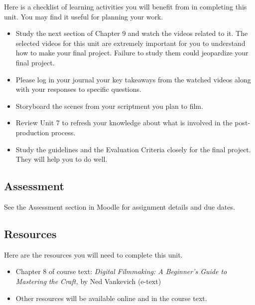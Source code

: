 \documentclass[
]{book}
\providecommand{\tightlist}{%
  \setlength{\itemsep}{0pt}\setlength{\parskip}{0pt}}
\begin{document}
\begin{reflect}
Here is a checklist of learning activities you will benefit from in completing this unit. You may find it useful for planning your work.

\begin{itemize}
\tightlist
\item
  Study the next section of Chapter 9 and watch the videos related to it. The selected videos for this unit are extremely important for you to understand how to make your final project. Failure to study them could jeopardize your final project.
\item
  Please log in your journal your key takeaways from the watched videos along with your responses to specific questions.
\item
  Storyboard the scenes from your scriptment you plan to film.
\item
  Review Unit 7 to refresh your knowledge about what is involved in the post-production process.
\item
  Study the guidelines and the Evaluation Criteria closely for the final project. They will help you to do well.
\end{itemize}
\end{reflect}

\hypertarget{assessment-15}{%
\subsection*{Assessment}\label{assessment-15}}

See the Assessment section in Moodle for assignment details and due dates.

\hypertarget{resources-8}{%
\subsection*{Resources}\label{resources-8}}

Here are the resources you will need to complete this unit.

\begin{itemize}
\tightlist
\item
  Chapter 8 of course text: \emph{Digital Filmmaking: A Beginner's Guide to Mastering the Craft,} by Ned Vankevich (e-text)
\item
  Other resources will be available online and in the course text.
\end{itemize}
\end{document}
